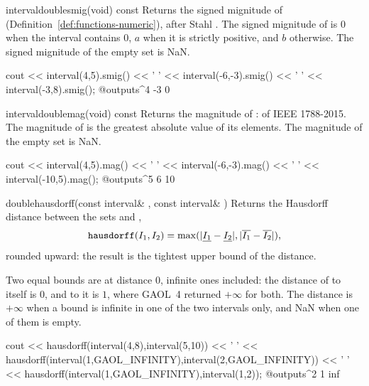 \documentclass[12pt,a4paper,twoside,openright]{book}
\begin{document}
\begin{defmethod}{interval}{double}{smig}{(void) const}
  Returns the signed mignitude of 
  (Definition~\ref{def:functions-numeric}), after Stahl
  \cite[def.~1.3.28]{Stahl:PhD}. The signed mignitude of  is $0$
  when the interval contains $0$, $a$ when it is strictly positive, and $b$
  otherwise. The signed mignitude of the empty set is NaN.
\begin{example}
cout << interval(4,5).smig() << ' '
     << interval(-6,-3).smig() << ' '
     << interval(-3,8).smig();
@outputs^4 -3 0~
\end{example}
\end{defmethod}

\begin{defmethod}{interval}{double}{mag}{(void) const}
  Returns the magnitude of :  of IEEE 1788-2015. The
  magnitude of  is the greatest absolute value of its elements.
  The magnitude of the empty set is NaN.
\begin{example}
cout << interval(4,5).mag() << ' '
     << interval(-6,-3).mag() << ' '
     << interval(-10,5).mag();
@outputs^5 6 10~
\end{example}
\end{defmethod}

\begin{deffun}{double}{hausdorff}{(const interval\& , const interval\& )}
  Returns the Hausdorff distance between the sets  and ,
\begin{equation*}
\texttt{hausdorff}(I_1,I_2)=\max(|\underline{I_1}-\underline{I_2}|,
                          |\overline{I_1}-\overline{I_2}|),
\end{equation*}
  rounded upward: the result is the tightest upper bound of the
  distance.\newinvfive

  Two equal bounds are at distance $0$, infinite ones included: the
  distance of  to itself is $0$, and to  it
  is $1$, where GAOL~4 returned $+\infty$ for both. The distance is
  $+\infty$ when a bound is infinite in one of the two intervals only, and
  NaN when one of them is empty.\newinvfive
\begin{example}
cout << hausdorff(interval(4,8),interval(5,10)) << ' '
     << hausdorff(interval(1,GAOL_INFINITY),interval(2,GAOL_INFINITY)) << ' '
     << hausdorff(interval(1,GAOL_INFINITY),interval(1,2));
@outputs^2 1 inf~
\end{example}
\end{deffun}
\end{document}
